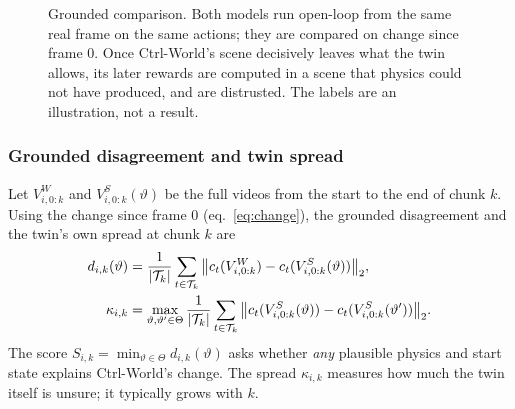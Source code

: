 \documentclass[11pt,a4paper]{article}
\theoremstyle{plain}
\theoremstyle{definition}
\theoremstyle{remark}
\newcommand{\VW}{V^{W}}
\newcommand{\VS}{V^{S}}
\begin{document}
\begin{figure}[h]
\centering
{}
\caption{Grounded comparison. Both models run open-loop from the same real frame on the same actions; they are compared on change since frame 0. Once Ctrl-World's scene decisively leaves what the twin allows, its later rewards are computed in a scene that physics could not have produced, and are distrusted. The labels are an illustration, not a result.}
\label{fig:grounded}
\end{figure}

\subsubsection{Grounded disagreement and twin spread}
Let $\VW_{i,0:k}$ and $\VS_{i,0:k}(\vartheta)$ be the full videos from the start to the end of chunk $k$. Using the change since frame 0 (eq.~\ref{eq:change}), the grounded disagreement and the twin's own spread at chunk $k$ are
\begin{align}\label{eq:grounded}
d_{i,k}(\vartheta)&=\frac{1}{|\mathcal T_k|}\sum_{t\in\mathcal T_k}\big\lVert c_t(\VW_{i,0:k})-c_t(\VS_{i,0:k}(\vartheta))\big\rVert_2,\\
\kappa_{i,k}&=\max_{\vartheta,\vartheta'\in\Theta}\frac{1}{|\mathcal T_k|}\sum_{t\in\mathcal T_k}\big\lVert c_t(\VS_{i,0:k}(\vartheta))-c_t(\VS_{i,0:k}(\vartheta'))\big\rVert_2 .\notag
\end{align}
The score $S_{i,k}=\min_{\vartheta\in\Theta}d_{i,k}(\vartheta)$ asks whether \emph{any} plausible physics and start state explains Ctrl-World's change. The spread $\kappa_{i,k}$ measures how much the twin itself is unsure; it typically grows with $k$.
\end{document}
